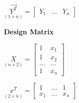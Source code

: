 \documentclass[11pt]{article}
\begin{document}
\(\underset{(1 \times n)}{\vec{Y^T}} = \begin{bmatrix}
Y_1 & ... & Y_n
\end{bmatrix}\)

\textbf{Design Matrix}

\(\underset{(n \times 2)}{X} = \begin{bmatrix}
1 & x_1\\
1 & x_2\\
... & ...\\
1 & x_n
\end{bmatrix}\)

\(\underset{(2 \times n)}{x^T} = \begin{bmatrix}
1 & ... & 1\\
x_1 & ... & x_n
\end{bmatrix}\)
\end{document}
